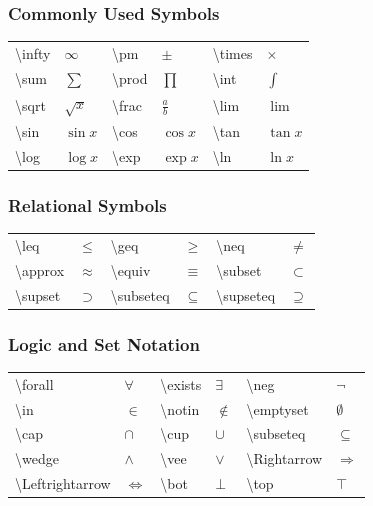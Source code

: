 \subsubsection{Commonly Used Symbols}
\begin{tabular}{ll | ll | ll}
\textbackslash infty & $\infty$ & \textbackslash pm & $\pm$ & \textbackslash times & $\times$ \\
\textbackslash sum & $\sum$ & \textbackslash prod & $\prod$ & \textbackslash int & $\int$ \\
\textbackslash sqrt & $\sqrt{x}$ & \textbackslash frac & $\frac{a}{b}$ & \textbackslash lim & $\lim$ \\
\textbackslash sin & $\sin x$ & \textbackslash cos & $\cos x$ & \textbackslash tan & $\tan x$ \\
\textbackslash log & $\log x$ & \textbackslash exp & $\exp x$ & \textbackslash ln & $\ln x$ \\
\end{tabular}

\subsubsection{Relational Symbols}
\begin{tabular}{ll | ll | ll}
\textbackslash leq & $\leq$ & \textbackslash geq & $\geq$ & \textbackslash neq & $\neq$ \\
\textbackslash approx & $\approx$ & \textbackslash equiv & $\equiv$ & \textbackslash subset & $\subset$ \\
\textbackslash supset & $\supset$ & \textbackslash subseteq & $\subseteq$ & \textbackslash supseteq & $\supseteq$ \\
\end{tabular}

\subsubsection{Logic and Set Notation}
\begin{tabular}{ll | ll | ll}
\textbackslash forall & $\forall$ & \textbackslash exists & $\exists$ & \textbackslash neg & $\neg$ \\
\textbackslash in & $\in$ & \textbackslash notin & $\notin$ & \textbackslash emptyset & $\emptyset$ \\
\textbackslash cap & $\cap$ & \textbackslash cup & $\cup$ & \textbackslash subseteq & $\subseteq$ \\
\textbackslash wedge & $\wedge$ & \textbackslash vee & $\vee$ & \textbackslash Rightarrow & $\Rightarrow$ \\
\textbackslash Leftrightarrow & $\Leftrightarrow$ & \textbackslash bot & $\bot$ & \textbackslash top & $\top$ \\
\end{tabular}

